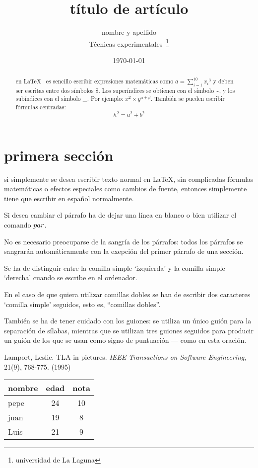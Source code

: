 \documentclass[a4paper, 12pt]{article}
\begin{document}
\title{título de artículo}
\author{nombre y apellido \\
      Técnicas experimentales~\footnote{universidad de La Laguna}
      }
\date{\today}
\maketitle
\begin{abstract}
   en \LaTeX{}~\cite{lam:86} es sencillo escribir expresiones
   matemáticas como $a=\sum_{i=1}^{10} {x_i}^{3}$
   y deben ser escritas entre dos símbolos \$.
   Los superíndices se obtienen con el símbolo \~{}, y
   los subíndices con el símbolo \_.
   Por ejemplo: $x^2 \times y^{\alpha + \beta}$.
   También se pueden escribir fórmulas centradas:
   \[h^2=a^2 + b^2 \]
\end{abstract}

\section{primera sección}
 si simplemente se desea escribir texto normal en LaTeX,
 sin complicadas f\'ormulas matem\'aticas o efectos especiales
 como cambios de fuente, entonces simplemente tiene que escribir
 en espa\~nol normalmente.\par
 Si desea cambiar el párrafo ha de dejar una línea en blanco o bien
 utilizar el comando $\\par$.
 
 No es necesario preocuparse de la sangría de los párrafos:
 todos los párrafos se sangrarán automáticamente con la exepción
 del primer párrafo de una sección.
 
 Se ha de distinguir entre la comilla simple `izquierda'
 y la comilla simple `derecha' cuando se escribe en el ordenador.
 
 En el caso de que quiera utilizar comillas dobles se han de 
 escribir dos caracteres `comilla simple'  seguidos, esto es,
 ``comillas dobles''.
 
 También se ha de tener cuidado con los guiones: se utiliza un único
 guión para la separación de sílabas, mientras que se utilizan
 tres guiones seguidos para producir un guión de los que se usan
 como signo de puntuación --- como en esta oración.
 \begin{thebibliography}{00}
     Lamport, Leslie.
     TLA in pictures.
     \emph{IEEE Transactions on Software Engineering},
     21(9), 768-775.
     (1995)
  \end{thebibliography}
 \bigskip
 \begin{tabular}{|l|c|c|}
 \hline
   nombre & edad & nota \\ \hline
   pepe   & 24   & 10   \\ \hline
   juan   & 19   & 8    \\ \hline
   Luis   & 21   & 9    \\ \hline
 \end{tabular}
\end{document}
